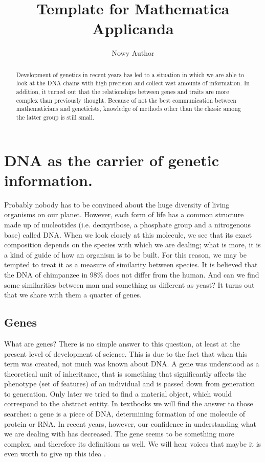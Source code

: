 \documentclass[]{MathAppl18}
\title[Mathematica Applicanda Template]{Template for Mathematica Applicanda
}
\author[N. Author]{Nowy Author\orcid{0000-0001-9413-3434}}%
\affiliation{Wrocław University of Technology}
\begin{document}
\vspace{-5ex}
\setcounter{page}{193} %
\Polskifalse

\begin{abstract}
Development of genetics in recent years has led to a situation in which we are able to look at the DNA chains with high precision and collect vast amounts of information. In addition, it turned out that the relationships between genes and traits are more complex than previously thought.  Because of not the best communication between mathematicians and geneticists, knowledge of methods other than the classic among the latter group is still small.
\end{abstract}

\section{DNA as the carrier of genetic information.}

Probably nobody has to be convinced about the huge diversity of living organisms on our planet. However, each form of life has a common structure made up of nucleotides (i.e. deoxyribose, a phosphate group and a nitrogenous base) called DNA. When we look closely at this molecule, we see that its exact composition depends on the species with which we are dealing; what is more, it is a kind of guide of how an organism is to be built. For this reason, we may be tempted to treat it as a measure of similarity between species. It is believed that the DNA of chimpanzee in 98\% does not differ from the human. And can we find some similarities between man and something as different as yeast? It turns out that we share with them a quarter of genes.

\subsection{Genes}
What are genes? There is no simple answer to this question, at least at the present level of development of science. This is due to the fact that when this term was created, not much was known about DNA. A gene was understood as a theoretical unit of inheritance, that is something that significantly affects the phenotype (set of features) of an individual and is passed down from generation to generation. Only later we tried to find a material object, which would correspond to the abstract entity. In textbooks we will find the answer to those searches: a gene is a piece of DNA, determining formation of one molecule of protein or RNA. In recent years, however, our confidence in understanding what we are dealing with has decreased. The gene seems to be something more complex, and therefore its definitions as well. We will hear voices that maybe it is even worth to give up this idea \cite{YosKunTak1998:Heart}.
\end{document}
